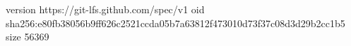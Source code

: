 version https://git-lfs.github.com/spec/v1
oid sha256:e80fb38056b9ff626c2521ccda05b7a63812f473010d73f37c08d3d29b2cc1b5
size 56369
